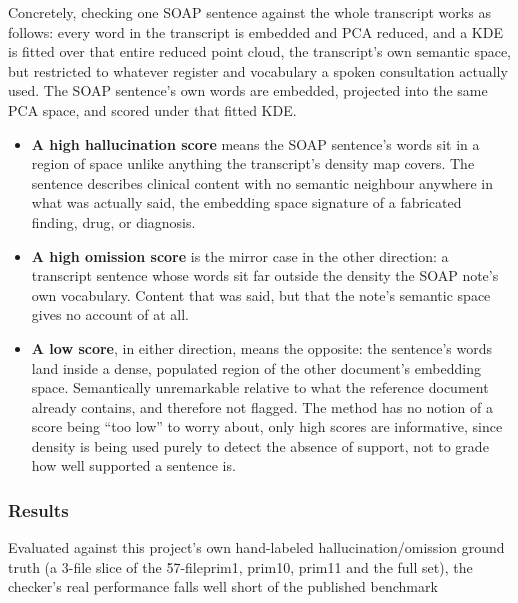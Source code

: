 \documentclass[11pt,a4paper]{article}
\begin{document}
 Concretely, checking one SOAP sentence against the whole transcript works as follows: every word in the transcript is embedded and PCA reduced, and a KDE is fitted over that entire reduced point cloud, the transcript's own semantic space, but restricted to whatever register and vocabulary a spoken consultation actually used. The SOAP sentence's own words are embedded, projected into the same PCA space, and scored under that fitted KDE. 

 \begin{itemize}
     \item \textbf{A high hallucination score} means the SOAP sentence's words sit in a region of space  unlike anything the transcript's density map covers. The sentence describes clinical content with no semantic neighbour anywhere in what was actually said, the embedding space signature of a fabricated finding, drug, or diagnosis. 
     \item  \textbf{A high omission score} is the mirror case in the other direction: a transcript sentence whose words sit far outside the density the SOAP note's own vocabulary. Content that was said, but that the note's semantic space gives no account of at all.
     \item \textbf{ A low score}, in either direction, means the opposite: the sentence's words land inside a dense, populated region of the other document's embedding space. Semantically unremarkable relative to what the reference document already contains, and therefore not flagged. The method has no notion of a score being “too low” to worry about, only high scores are informative, since density is being used purely to detect the absence of support, not to grade how well supported a sentence is.
 \end{itemize}

\subsubsection{Results}
Evaluated against this project's own hand-labeled hallucination/omission ground truth (a 3-file slice of the 57-fileprim1, prim10, prim11 and the full set), the checker's real performance falls well short of the published benchmark 

\begin{table}[htbp]
  \centering
  \caption{ Observed scores from the KDE proposed solution, showing hallucinations work to a degree and omission do not as much}
  \label{tab:KDE_sub_results}
\end{table}
\end{document}
